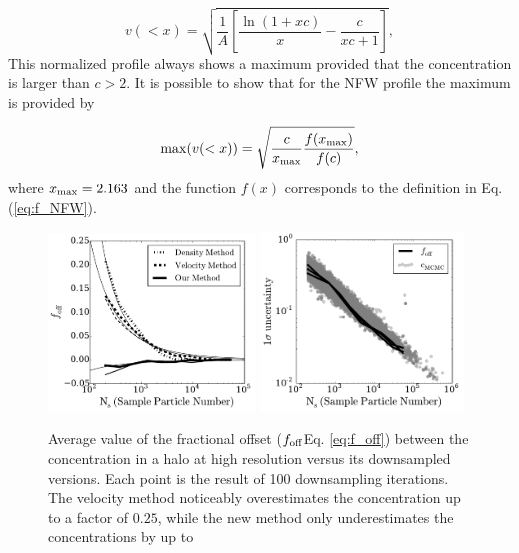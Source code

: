 \documentclass{emulateapj}
\begin{document}
\begin{equation}
v(<x)=\sqrt{\frac{1}{A}\left[\frac{\ln\left(1+xc\right)}{x}-\frac{c}{xc+1}\right]},
\end{equation}
%
This normalized profile always shows a maximum provided that the
concentration is larger than $c>2$.  It is possible to show that for
the NFW profile the maximum is provided by

\begin{equation}
\mathrm{max}(v(<x)) = \sqrt{\frac{c}{x_{\rm max}}\frac{f(x_{\rm
      max})}{f(c)}},
\label{eq:max_v}
\end{equation}
where $x_{\rm max}=2.163$ \citep{Klypin2016} and the function $f(x)$
corresponds to the definition in Eq. (\ref{eq:f_NFW}).


\begin{figure}
\begin{center}
  \includegraphics[width=0.49\textwidth]{avg_foff_bolshoi.pdf}
  \includegraphics[width=0.48\textwidth]{sigma_foff_bolshoi.pdf}
\end{center}
\vspace{-0.5cm}
\caption{Average value of the fractional offset ($f_{\rm
    off}$Eq. \ref{eq:f_off}) between the concentration in a halo at
  high resolution versus its downsampled versions.  Each point is the
  result of 100 downsampling iterations.  The velocity method
  noticeably overestimates the concentration up to a factor of $0.25$,
  while the new method only underestimates the concentrations by up to
}
\end{figure}
\end{document}
